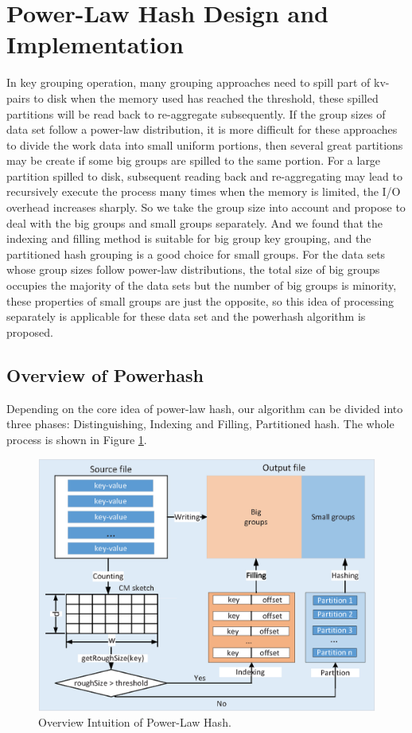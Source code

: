 \section{Power-Law Hash Design and Implementation}
\label{sec:hash}

In key grouping operation, many grouping approaches need to spill part of kv-pairs to disk when the memory used has reached the threshold, these spilled partitions will be read back to re-aggregate subsequently. If the group sizes of data set follow a power-law distribution, 
it is more difficult for these approaches to divide the work data into small uniform portions, then several great partitions may be create if some big groups are spilled to the same portion. For a large partition spilled to disk, subsequent reading back and re-aggregating may lead to recursively execute the process many times when the memory is limited, the I/O overhead increases sharply. So we take the group size into account and propose to deal with the big groups and small groups separately. And we found that the indexing and filling method is suitable for big group key grouping, and the partitioned hash grouping is a good choice for small groups. For the data sets whose group sizes follow power-law distributions, the total size of big groups occupies the majority of the data sets but the number of big groups is minority, these properties of small groups are just the opposite, so this idea of processing separately is applicable for these data set and the powerhash algorithm is proposed. 

\subsection{Overview of Powerhash}%
Depending on the core idea of power-law hash, our algorithm can be divided into three phases: Distinguishing, Indexing and Filling, Partitioned hash. The whole process is shown in Figure \ref{fig:pwHash}.
\begin{figure}
\includegraphics[width=.5\textwidth]{fig/pwhash}
\caption{Overview Intuition of Power-Law Hash.}
\label{fig:pwHash}
\end{figure}


